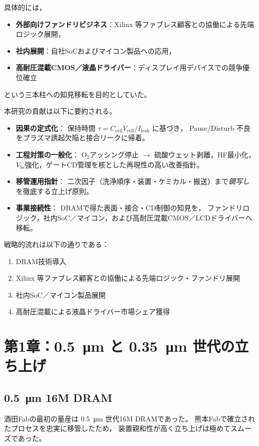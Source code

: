 \documentclass[conference]{IEEEtran}
\begin{document}
具体的には，
\begin{itemize}
  \item \textbf{外部向けファンドリビジネス}：Xilinx 等ファブレス顧客との協働による先端ロジック展開，
  \item \textbf{社内展開}：自社SoCおよびマイコン製品への応用，
  \item \textbf{高耐圧混載CMOS／液晶ドライバー}：ディスプレイ用デバイスでの競争優位確立
\end{itemize}
という三本柱への知見移転を目的としていた。

本研究の貢献は以下に要約される。
\begin{itemize}
  \item \textbf{因果の定式化}：
    保持時間 $\tau=C_{\mathrm{cell}}V_{\mathrm{cell}}/I_{\mathrm{leak}}$ に基づき，
    Pause/Disturb 不良をプラズマ誘起欠陥と接合リークに帰着。
  \item \textbf{工程対策の一般化}：
    O$_2$アッシング停止 $\rightarrow$ 硫酸ウェット剥離，HF最小化，
    $V_{bs}$強化，ゲートCD管理を核とした再現性の高い改善指針。
  \item \textbf{移管運用指針}：
    二次因子（洗浄順序・装置・ケミカル・搬送）まで\emph{鏡写し}を徹底する立上げ原則。
  \item \textbf{事業接続性}：
    DRAMで得た表面・接合・CD制御の知見を，
    ファンドリロジック，社内SoC／マイコン，および高耐圧混載CMOS／LCDドライバーへ移転。
\end{itemize}

戦略的流れは以下の通りである：
\begin{enumerate}
  \item DRAM技術導入
  \item Xilinx 等ファブレス顧客との協働による先端ロジック・ファンドリ展開
  \item 社内SoC／マイコン製品展開
  \item 高耐圧混載による液晶ドライバー市場シェア獲得
\end{enumerate}

\section{第1章：\texorpdfstring{\SI{0.5}{\micro\meter}}{0.5μm} と \texorpdfstring{\SI{0.35}{\micro\meter}}{0.35μm} 世代の立ち上げ}

\subsection{\SI{0.5}{\micro\meter} 16M DRAM}
酒田Fabの最初の量産は \SI{0.5}{\micro\meter} 世代16M DRAMであった。
熊本Fabで確立されたプロセスを忠実に移管したため，
装置親和性が高く立ち上げは極めてスムーズであった。
\end{document}
